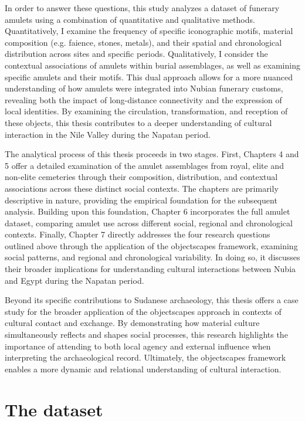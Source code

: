 In order to answer these questions, this study analyzes a dataset of funerary amulets using a combination of quantitative and qualitative methods. Quantitatively, I examine the frequency of specific iconographic motifs, material composition (e.g. faience, stones, metals), and their spatial and chronological distribution across sites and specific periods. Qualitatively, I consider the contextual associations of amulets within burial assemblages, as well as examining specific amulets and their motifs. This dual approach allows for a more nuanced understanding of how amulets were integrated into Nubian funerary customs, revealing both the impact of long-distance connectivity and the expression of local identities. By examining the circulation, transformation, and reception of these objects, this thesis contributes to a deeper understanding of cultural interaction in the Nile Valley during the Napatan period.


The analytical process of this thesis proceeds in two stages. First, Chapters 4 and 5 offer a detailed examination of the amulet assemblages from royal, elite and non-elite cemeteries through their composition, distribution, and contextual associations across these distinct social contexts. The chapters are primarily descriptive in nature, providing the empirical foundation for the subsequent analysis. Building upon this foundation, Chapter 6 incorporates the full amulet dataset, comparing amulet use across different social, regional and chronological contexts. Finally, Chapter 7 directly addresses the four research questions outlined above through the application of the objectscapes framework, examining social patterns, and regional and chronological variability. In doing so, it discusses their broader implications for understanding cultural interactions between Nubia and Egypt during the Napatan period.


Beyond its specific contributions to Sudanese archaeology, this thesis offers a case study for the broader application of the objectscapes approach in contexts of cultural contact and exchange. By  demonstrating how material culture simultaneously reflects and shapes social processes, this research highlights the importance of attending to both local agency and external influence when interpreting the archaeological record. Ultimately, the objectscapes framework enables a more dynamic and relational understanding of cultural interaction.


\section{The dataset}



